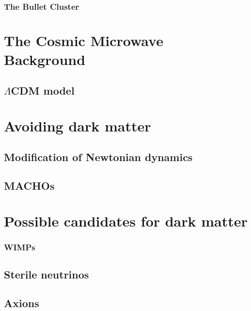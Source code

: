 \subsubsection{The Bullet Cluster}\label{sec:DMOverview/BulletCluster}

\section{The Cosmic Microwave Background}\label{sec:DMOverview/CMB}

\subsection{$\Lambda$CDM model}\label{sec:DMOverview/LambdaCDM}

\section{Avoiding dark matter}\label{sec:DMOverview/AvoidDM}

\subsection{Modification of Newtonian dynamics}\label{sec:DMOverview/MOND}

\subsection{MACHOs}\label{sec:DMOverview/MACHOs}

\section{Possible candidates for dark matter}\label{sec:DMOverview/Candidates4DM}

\subsubsection{WIMPs}\label{sec:DMOverview/WIMPs}

\subsection{Sterile neutrinos}\label{sec:DMOverview/Neutrinos}

\subsection{Axions}\label{sec:DMOverview/Axions}

